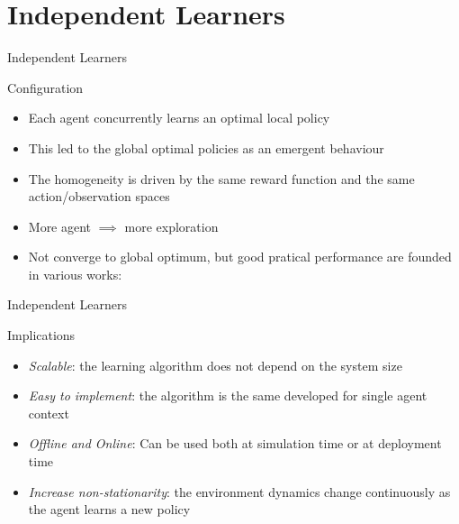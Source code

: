 \documentclass[presentation]{beamer}\mode<presentation>{\usetheme{AMSBolognaFC}}
\begin{document}
\section{Independent Learners}
\begin{frame}{Independent Learners}
	\begin{exampleblock}{Configuration}
		\begin{itemize}
			\item Each agent concurrently learns an optimal local policy
			\item This led to the global optimal policies as an emergent behaviour
			\item The homogeneity is driven by the same reward function and the same action/observation spaces
			\item More agent $\implies$ more exploration
			\item Not converge to global optimum, but good pratical performance are founded in various works: \cite{DBLP:conf/atal/TumerA07, DBLP:conf/atal/TumerAW02, DBLP:conf/iros/WangS06}
		\end{itemize}
	\end{exampleblock}
\end{frame}
\begin{frame}{Independent Learners}
	\begin{exampleblock}{Implications}
		\begin{itemize}
			\item [{\color{teal} \faThumbsUp}] \emph{Scalable}: the learning algorithm does not depend on the system size
			\item [{\color{teal} \faThumbsUp}] \emph{Easy to implement}: the algorithm is the same developed for single agent context
			\item [{\color{teal} \faThumbsUp}] \emph{Offline and Online}: Can be used both at simulation time or at deployment time
			\item [{\color{red} \faThumbsDown}] \emph{Increase non-stationarity}: the environment dynamics change continuously as the agent learns a new policy
		\end{itemize}
	\end{exampleblock}
\end{frame}
\end{document}
